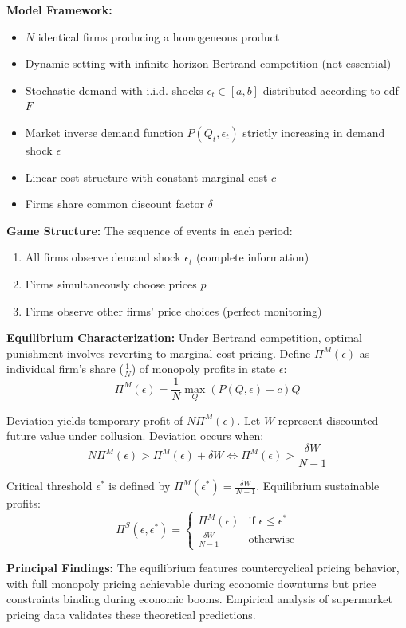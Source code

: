 \documentclass[11pt]{elegantbook_2}
\begin{document}
\textbf{Model Framework:}
\begin{itemize}
    \item $N$ identical firms producing a homogeneous product
    \item Dynamic setting with infinite-horizon Bertrand competition (not essential)
    \item Stochastic demand with i.i.d. shocks $\epsilon_t \in [a,b]$ distributed according to cdf $F$
    \item Market inverse demand function $P(Q_t,\epsilon_t)$ strictly increasing in demand shock $\epsilon$
    \item Linear cost structure with constant marginal cost $c$
    \item Firms share common discount factor $\delta$
\end{itemize}

\textbf{Game Structure:}
The sequence of events in each period:
\begin{enumerate}
    \item All firms observe demand shock $\epsilon_t$ (complete information)
    \item Firms simultaneously choose prices $p$
    \item Firms observe other firms' price choices (perfect monitoring)
\end{enumerate}

\textbf{Equilibrium Characterization:}
Under Bertrand competition, optimal punishment involves reverting to marginal cost pricing. Define $\Pi^M(\epsilon)$ as individual firm's share ($\frac{1}{N}$) of monopoly profits in state $\epsilon$:
\[\Pi^M(\epsilon) = \frac{1}{N}\max_Q(P(Q,\epsilon)-c)Q\]

Deviation yields temporary profit of $N\Pi^M(\epsilon)$. Let $W$ represent discounted future value under collusion. Deviation occurs when:
\[N\Pi^M(\epsilon) > \Pi^M(\epsilon) + \delta W \Leftrightarrow \Pi^M(\epsilon) > \frac{\delta W}{N-1}\]

Critical threshold $\epsilon^*$ is defined by $\Pi^M(\epsilon^*) = \frac{\delta W}{N-1}$. Equilibrium sustainable profits:
\[\Pi^S(\epsilon,\epsilon^*) = \begin{cases}
    \Pi^M(\epsilon) & \text{if } \epsilon \leq \epsilon^* \\
    \frac{\delta W}{N-1} & \text{otherwise}
\end{cases}\]

\textbf{Principal Findings:}
The equilibrium features countercyclical pricing behavior, with full monopoly pricing achievable during economic downturns but price constraints binding during economic booms. Empirical analysis of supermarket pricing data validates these theoretical predictions.
\end{document}
